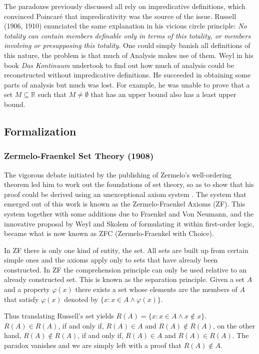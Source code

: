 \documentclass[12p]{article}
\newcommand{\RR}{\mathbb{R}}
\theoremstyle{definition}
\begin{document}
The paradoxes previously discussed all rely on impredicative definitions, which convinced Poincaré that impredicativity was the source of the issue. Russell (1906, 1910) enunciated the same explanation in his vicious circle principle: \textit{No totality can contain members definable only in terms of this totality, or members involving or presupposing this totality}. One could simply banish all definitions of this nature, the problem is that much of Analysis makes use of them. Weyl in his book \textit{Das Kontinuum} undertook to find out how much of analysis could be reconstructed without impredicative definitions. He succeeded in obtaining some parts of analysis but much was lost. For example, he was unable to prove that a set $M \subseteq \RR$ such that $M \neq \emptyset$ that has an upper bound also has a least upper bound\cite{kleene-meta}.
\subsection{Formalization}
\subsubsection{Zermelo-Fraenkel Set Theory (1908)}
The vigorous debate initiated by the publishing of Zermelo's well-ordering theorem led him to work out the foundations of set theory, so as to show that his proof could be derived using an unexceptional axiom system \cite{ferreirós_2001}. The system that emerged out of this work is known as the Zermelo-Fraenkel Axioms (ZF). This system together with some additions due to Fraenkel and Von Neumann, and the innovative proposal by Weyl and Skolem of formulating it within first-order logic, became what is now known as ZFC (Zermelo-Fraenkel with Choice).

In ZF there is only one kind of entity, the set. All sets are built up from certain simple ones and the axioms apply only to sets that have already been constructed. In ZF the comprehension principle can only be used relative to an already constructed set. This is known as the separation principle. Given a set $A$ and a property $\varphi(x)$ there exists a set whose elements are the members of $A$ that satisfy $\varphi(x)$ denoted by $\{ x : x \in A \wedge \varphi(x) \}$.


Thus translating Russell's set yields $R(A) = \{ x : x \in A \wedge x \notin x \}$. $R(A) \in R(A)$, if and only if, $R(A) \in A$ and $R(A) \notin R(A)$, on the other hand, $R(A) \notin R(A)$, if and only if, $R(A) \in A$ and $R(A) \in R(A)$. The paradox vanishes and we are simply left with a proof that $R(A) \notin A$.
\end{document}
